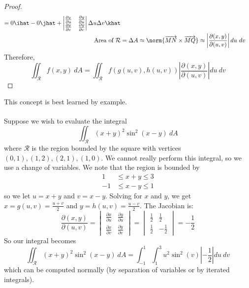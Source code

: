 \documentclass[12pt]{article}
\begin{document}
\begin{proof}
\[\begin{aligned}
= 0\ihat - 0\jhat + 
\begin{vmatrix}
\frac{\partial x}{\partial u} & \frac{\partial y}{\partial u} \\
\frac{\partial x}{\partial v} & \frac{\partial y}{\partial v} 
\end{vmatrix}
\Delta u\Delta v \khat \\
\text{Area of } \mathcal{R} &= \Delta A \approx \norm{\overrightarrow{MN} \times \overrightarrow{MQ}} \approx \left|\frac{\partial (x,y)}{\partial(u,v)}\right|du \ dv
\end{aligned}
\]
Therefore,\[ \iint_{\mathcal{R}} f(x,y) \ dA = \iint_{\mathcal{R}}f(g(u,v),h(u,v))\left|\frac{\partial (x,y)}{\partial (u,v)}\right| du \ dv \]
\end{proof}

This concept is best learned by example.\\ \\
Suppose we wish to evaluate the integral \[ \iint_{\mathcal{R}} (x+y)^2\sin^2(x-y) \ dA \] where $\mathcal{R}$ is the region bounded by the square with vertices $(0,1),(1,2),(2,1),(1,0)$. We cannot really perform this integral, so we use a change of variables. We note that the region is bounded by
\[
\begin{aligned}
1 &\le x+y \le 3 \\
-1 &\le x-y \le 1
\end{aligned}
\]
so we let $u = x+y$ and $v = x-y$. Solving for $x$ and $y$, we get $x = g(u,v) = \frac{u+v}{2}$ and $y = h(u,v) = \frac{u-v}{2}$. The Jacobian is:
\[ \frac{\partial (x,y)}{\partial (u,v)} = \begin{vmatrix}
\frac{\partial x}{\partial u} & \frac{\partial y}{\partial u} \\
\frac{\partial x}{\partial v} & \frac{\partial y}{\partial v} 
\end{vmatrix} = \begin{vmatrix}
\frac{1}{2} & \frac{1}{2} \\ \frac{1}{2} & -\frac{1}{2}
\end{vmatrix} = -\frac{1}{2} \]
So our integral becomes  \[ \iint_{\mathcal{R}} (x+y)^2\sin^2(x-y) \ dA = \int_{-1}^1\int_1^3u^2\sin^2(v) \left|-\frac{1}{2}\right| du \ dv \]
which can be computed normally (by separation of variables or by iterated integrals).
\end{document}
